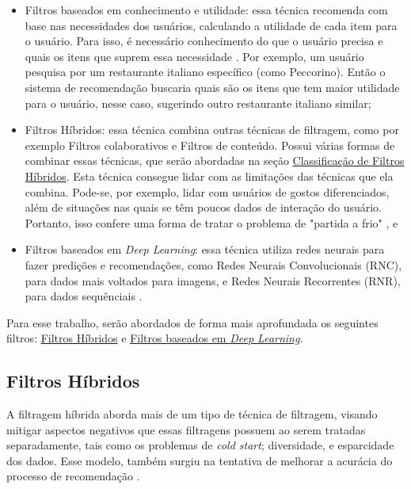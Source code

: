 \begin{itemize}
\item Filtros baseados em conhecimento e utilidade: essa técnica recomenda com base nas necessidades dos usuários, 
calculando a utilidade de cada item para o usuário. Para isso, é necessário conhecimento do que o usuário precisa e 
quais os itens que suprem essa necessidade \cite{burke2002hybrid}. Por exemplo, um usuário pesquisa por um restaurante
italiano específico (como Peccorino). Então o sistema de recomendação buscaria quais são os itens que tem maior utilidade para 
o usuário, nesse caso, sugerindo outro restaurante italiano similar;

\item Filtros Híbridos: essa técnica combina outras técnicas de filtragem, como por exemplo Filtros colaborativos e Filtros
de conteúdo. Possui várias formas de combinar essas técnicas, que serão abordadas na seção 
\hyperref[subsubsec:tiposfh]{Classificação de Filtros Híbridos}. Esta técnica consegue lidar com as limitações das técnicas que 
ela combina. Pode-se, por exemplo, lidar com usuários de gostos diferenciados, além de situações nas quais se
têm poucos dados de interação do usuário. Portanto, isso confere uma forma de tratar o problema de 
"partida a frio" \cite{stratoflow-recommendation}, e 

\item Filtros baseados em \textit{Deep Learning}: essa técnica utiliza redes neurais para fazer predições e recomendações, 
como Redes Neurais Convolucionais (RNC), para dados mais voltados para imagens, e Redes Neurais Recorrentes (RNR), para dados
sequênciais \cite{nvidia-recommendation}.
\end{itemize}

Para esse trabalho, serão abordados de forma mais aprofundada os seguintes filtros:
\hyperref[subsec:hibridos]{Filtros Híbridos} e \hyperref[subsec:filtrodeep]{Filtros baseados em \textit{Deep Learning}}.

\subsection{Filtros Híbridos}\label{subsec:hibridos}
A filtragem híbrida aborda mais de um tipo de técnica de filtragem, visando mitigar aspectos negativos que essas filtragens
possuem ao serem tratadas separadamente, tais como os problemas de \textit{cold start}; diversidade, e esparcidade dos dados. 
Esse modelo, também surgiu
na tentativa de melhorar a acurácia do processo de recomendação \cite{thorat2015survey}.

